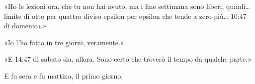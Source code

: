 «Ho le lezioni ora, che tu non hai avuto, ma i fine settimana sono liberi, quindi… limite di otto per quattro diviso epsilon per epsilon che tende a zero più… 10:47 di domenica.»

«Io l’ho fatto in tre giorni, veramente.»

«E 14:47 di sabato sia, allora. Sono certo che troverò il tempo da qualche parte.»

E fu sera e fu mattina, il primo giorno.



